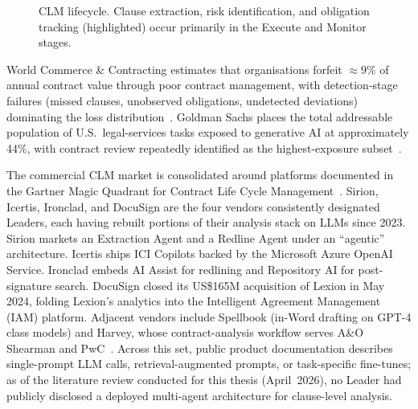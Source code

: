 \begin{figure}[t]
  \centering
  \caption{CLM lifecycle. Clause extraction, risk identification, and obligation
  tracking (highlighted) occur primarily in the Execute and Monitor stages.}
  \label{fig:clm-lifecycle}
\end{figure}

World Commerce \& Contracting estimates that organisations forfeit $\approx\!9\%$
of annual contract value through poor contract management, with detection-stage
failures (missed clauses, unobserved obligations, undetected deviations) dominating
the loss distribution~\cite{worldcc2025benchmark}. Goldman Sachs places the total
addressable population of U.S.\ legal-services tasks exposed to generative AI at
approximately 44\%, with contract review repeatedly identified as the
highest-exposure subset~\cite{goldmansachs2023ai}.

The commercial CLM market is consolidated around platforms documented in the
Gartner Magic Quadrant for Contract Life Cycle Management~\cite{gartner2024clm}.
Sirion, Icertis, Ironclad, and
DocuSign are the four vendors consistently designated Leaders, each having rebuilt
portions of their analysis stack on LLMs since 2023. Sirion markets an Extraction
Agent and a Redline Agent under an ``agentic'' architecture. Icertis ships ICI Copilots
backed by the Microsoft Azure OpenAI Service. Ironclad embeds AI Assist for redlining
and Repository AI for post-signature search. DocuSign closed its US\$165M acquisition
of Lexion in May 2024, folding Lexion's analytics into the Intelligent Agreement
Management (IAM) platform. Adjacent vendors include Spellbook (in-Word drafting on
GPT-4 class models) and Harvey, whose contract-analysis workflow serves A\&O Shearman
and PwC~\cite{harvey2023ao,harvey2023pwc}. Across this set, public product
documentation describes single-prompt LLM calls, retrieval-augmented prompts, or
task-specific fine-tunes; as of the literature review conducted for this thesis
(April~2026), no Leader had publicly disclosed a deployed multi-agent architecture
for clause-level analysis.

